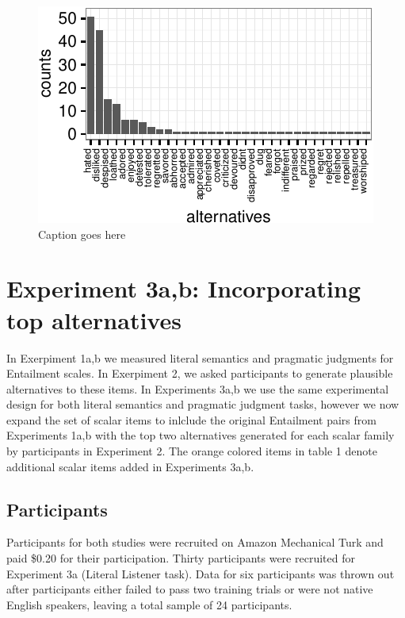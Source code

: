 \documentclass[10pt, letterpaper]{article}
\newenvironment{CodeChunk}{}{}
\begin{document}
\begin{CodeChunk}
\begin{figure}[t]

{\centering \includegraphics{figs/exp2_altsPlot_likedLoved-1} 

}

\caption[Caption goes here]{Caption goes here}\label{fig:exp2_altsPlot_likedLoved}
\end{figure}
\end{CodeChunk}

\section{Experiment 3a,b: Incorporating top
alternatives}\label{experiment-3ab-incorporating-top-alternatives}

In Exerpiment 1a,b we measured literal semantics and pragmatic judgments
for Entailment scales. In Exerpiment 2, we asked participants to
generate plausible alternatives to these items. In Experiments 3a,b we
use the same experimental design for both literal semantics and
pragmatic judgment tasks, however we now expand the set of scalar items
to inlclude the original Entailment pairs from Experiments 1a,b with the
top two alternatives generated for each scalar family by participants in
Experiment 2. The orange colored items in table 1 denote additional
scalar items added in Experiments 3a,b.

\subsection{Participants}\label{participants-2}

Participants for both studies were recruited on Amazon Mechanical Turk
and paid \$0.20 for their participation. Thirty participants were
recruited for Experiment 3a (Literal Listener task). Data for six
participants was thrown out after participants either failed to pass two
training trials or were not native English speakers, leaving a total
sample of 24 participants.
\end{document}
